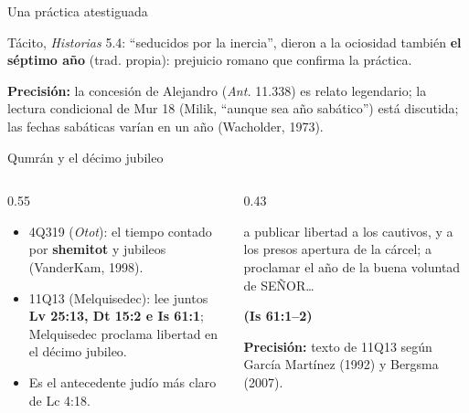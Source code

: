 \documentclass[hyperref={bookmarks=false},aspectratio=169]{beamer}
\newcommand{\SENOR}{S{\fontsize{0.78em}{1em}\selectfont EÑOR}}
\newcommand{\fuente}[1]{\par\hfill{\upshape\bfseries\footnotesize\textcolor{tierraroja}{#1}}}
\newcommand{\destacar}[1]{\textbf{\textcolor{tierraroja}{#1}}}
\newcommand{\precision}[1]{{\footnotesize\color{sepia}\textbf{Precisión:} #1}}
\begin{document}
\begin{frame}{Una práctica atestiguada}
\centering
{}\par\medskip
\small\RaggedRight Tácito, \emph{Historias} 5.4: ``seducidos por la inercia'', dieron a la ociosidad también \destacar{el séptimo año} (trad. propia): prejuicio romano que confirma la práctica.\par\smallskip
\precision{la concesión de Alejandro (\emph{Ant.} 11.338) es relato legendario; la lectura condicional de Mur 18 (Milik, ``aunque sea año sabático'') está discutida; las fechas sabáticas varían en un año (Wacholder, 1973).}
\end{frame}

\begin{frame}{Qumrán y el décimo jubileo}
\begin{columns}[c,onlytextwidth]
\begin{column}{0.55\textwidth}\small
\begin{itemize}
\item 4Q319 (\emph{Otot}): el tiempo contado por \destacar{shemitot} y jubileos (VanderKam, 1998).
\item 11Q13 (Melquisedec): lee juntos \destacar{Lv 25:13, Dt 15:2 e Is 61:1}; Melquisedec proclama libertad en el décimo jubileo.
\item Es el antecedente judío más claro de Lc 4:18.
\end{itemize}
\end{column}
\begin{column}{0.43\textwidth}
\begin{cita}a publicar libertad a los cautivos, y a los presos apertura de la cárcel; a proclamar el año de la buena voluntad de \SENOR\ldots\fuente{(Is 61:1--2)}\end{cita}
\scriptsize\precision{texto de 11Q13 según García Martínez (1992) y Bergsma (2007).}
\end{column}
\end{columns}
\end{frame}
\end{document}
